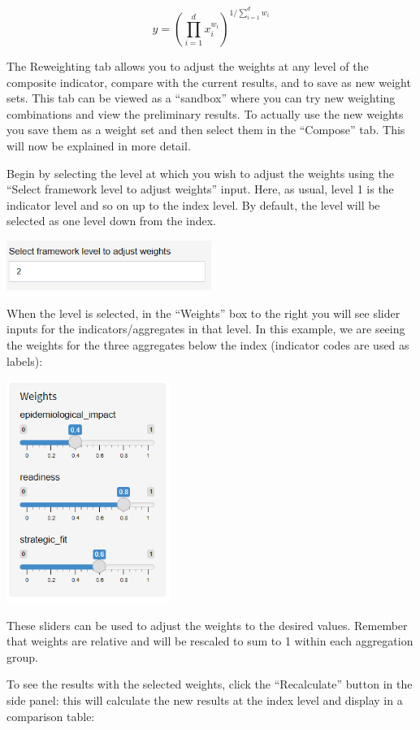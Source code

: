 \documentclass[
  letterpaper,
  DIV=11,
  numbers=noendperiod]{scrreprt}
\begin{document}
\[ y = \left( \prod_{i=1}^d x_i^{w_i} \right)^{1 / \sum_{i=1}^d w_i} \]

The Reweighting tab allows you to adjust the weights at any level of the
composite indicator, compare with the current results, and to save as
new weight sets. This tab can be viewed as a ``sandbox'' where you can
try new weighting combinations and view the preliminary results. To
actually use the new weights you save them as a weight set and then
select them in the ``Compose'' tab. This will now be explained in more
detail.

Begin by selecting the level at which you wish to adjust the weights
using the ``Select framework level to adjust weights'' input. Here, as
usual, level 1 is the indicator level and so on up to the index level.
By default, the level will be selected as one level down from the index.

\includegraphics[width=0.5\textwidth,height=\textheight]{figs/reweighting_1.png}

When the level is selected, in the ``Weights'' box to the right you will
see slider inputs for the indicators/aggregates in that level. In this
example, we are seeing the weights for the three aggregates below the
index (indicator codes are used as labels):

\includegraphics[width=0.4\textwidth,height=\textheight]{figs/reweighting_2.png}

These sliders can be used to adjust the weights to the desired values.
Remember that weights are relative and will be rescaled to sum to 1
within each aggregation group.

To see the results with the selected weights, click the ``Recalculate''
button in the side panel: this will calculate the new results at the
index level and display in a comparison table:
\end{document}
